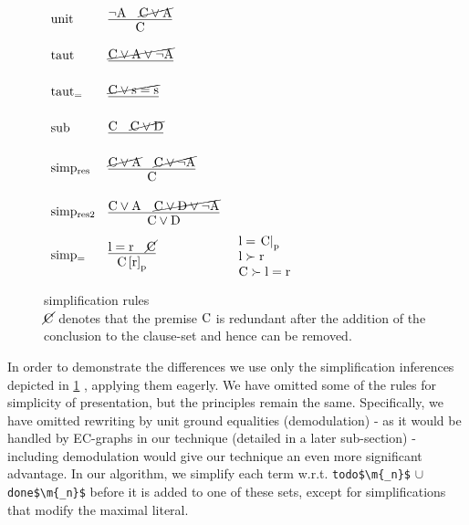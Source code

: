 \begin{figure}
$
\begin{array}[c]{llll}
\m{unit} & \vcenter{\infer[]{\m{C}                            }{\m{\lnot A}  & \cancel{\m{C \lor A}}}} & \parbox[c][1.0cm]{3cm}{}\\
\m{taut} & \vcenter{\infer[]{\m{}                             }{\cancel{\m{C \lor A \lor \lnot A}}}} & \parbox[c][1.0cm]{3cm}{}\\
\m{taut_{=}} & \vcenter{\infer[]{\m{}                             }{\cancel{\m{C \lor s=s}}}} & \parbox[c][1.0cm]{3cm}{}\\
\m{sub} & \vcenter{\infer[]  {\m{}                             }{\m{C} & \cancel{\m{C \lor D}}}} & \parbox[c][1.0cm]{3cm}{}\\
\m{simp_{res}} & \vcenter{\infer[]{\m{C}                      }{\cancel{\m{C \lor A }} & \cancel{\m{C \lor \lnot A}}}} & \parbox[c][1.2cm]{3cm}{}\\
\m{simp_{res2}} & \vcenter{\infer[]{\m{C \lor D}              }{\m{C \lor A } & \cancel{\m{C \lor D \lor \lnot A}}}} & \parbox[c][1.2cm]{3cm}{}\\
\m{simp_{=}} & \vcenter{\infer[]{\m{\termRepAt{C}{r}{p}}}{\m{l=r} & \cancel{\m{C}}}}   &
\parbox[c][1.2cm]{3cm}{\m{l=\termAt{C}{p}}\\\m{l \succ r}\\\m{C \succ l=r}}\\
\end{array}
$
\caption{simplification rules\\
$\cancel{\mathrm{C}}$ denotes that the premise $\mathrm{C}$ is redundant after the addition of the conclusion to the clause-set and hence can be removed.
}
\label{simp_rules.1}
\end{figure}

In order to demonstrate the differences we use only the simplification inferences depicted in \ref{simp_rules.1} , applying them eagerly.
We have omitted some of the rules for simplicity of presentation, but the principles remain the same.
Specifically, we have omitted rewriting by unit ground equalities (demodulation) - as it would be handled by EC-graphs in our technique (detailed in a later sub-section) - 
including demodulation would give our technique an even more significant advantage.
In our algorithm, we simplify each term w.r.t. \lstinline|todo$\m{_n}$| $\cup$ \lstinline|done$\m{_n}$| before it is added to one of these sets,
except for simplifications that modify the maximal literal.


